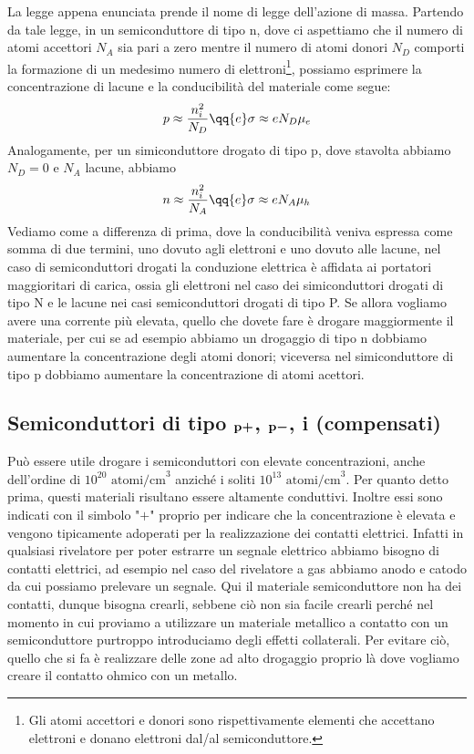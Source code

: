 La legge appena enunciata prende il nome di legge dell'azione di massa. Partendo da tale legge, in un semiconduttore di tipo n, dove ci aspettiamo che il numero di atomi accettori $N_A$ sia pari a zero mentre il numero di atomi donori $N_D$ comporti la formazione di un medesimo numero di elettroni\footnote{Gli atomi accettori e donori sono rispettivamente elementi che accettano elettroni e donano elettroni dal/al semiconduttore.}, possiamo esprimere la concentrazione di lacune e la conducibilità del materiale come segue:
\begin{equation*}
   p \approx \frac{n_i^2}{N_D}
   \qq{e}
   \sigma \approx e N_D \mu_e
\end{equation*}
Analogamente, per un simiconduttore drogato di tipo p, dove stavolta abbiamo $N_D=0$ e $N_A$ lacune, abbiamo 
\begin{equation*}
   n \approx \frac{n_i^2}{N_A}
   \qq{e}
   \sigma \approx e N_A \mu_h
\end{equation*}
Vediamo come a differenza di prima, dove la conducibilità veniva espressa come somma di due termini, uno dovuto agli elettroni e uno dovuto alle lacune, nel caso di semiconduttori drogati la conduzione elettrica è affidata ai portatori maggioritari di carica, ossia gli elettroni nel caso dei simiconduttori drogati di tipo N e le lacune nei casi semiconduttori drogati di tipo P. Se allora vogliamo avere una corrente più elevata, quello che dovete fare è drogare maggiormente il materiale, per cui se ad esempio abbiamo un drogaggio di tipo n dobbiamo aumentare la concentrazione degli atomi donori; viceversa nel simiconduttore di tipo p dobbiamo aumentare la concentrazione di atomi acettori.

\subsection[Semiconduttori di tipo \texorpdfstring{$\rm p+$}{p+}, \texorpdfstring{$\rm p-$}{p-}, i (compensati)]
{Semiconduttori di tipo $\boldsymbol{\rm p+}$, $\boldsymbol{\rm p-}$, i (compensati)}
Può essere utile drogare i semiconduttori con elevate concentrazioni, anche dell'ordine di $10^{20}\text{ atomi/cm}^3$ anziché i soliti $10^{13}\text{ atomi/cm}^3$. Per quanto detto prima, questi materiali risultano essere altamente conduttivi. Inoltre essi sono indicati con il simbolo "$+$" proprio per indicare che la concentrazione è elevata e vengono tipicamente adoperati per la realizzazione dei contatti elettrici. Infatti in qualsiasi rivelatore per poter estrarre un segnale elettrico abbiamo bisogno di contatti elettrici, ad esempio nel caso del rivelatore a gas abbiamo anodo e catodo da cui possiamo prelevare un segnale. Qui il materiale semiconduttore non ha dei contatti, dunque bisogna crearli, sebbene ciò non sia facile crearli perché nel momento in cui proviamo a utilizzare un materiale metallico a contatto con un semiconduttore purtroppo introduciamo degli effetti collaterali. Per evitare ciò, quello che si fa è realizzare delle zone ad alto drogaggio proprio là dove vogliamo creare il contatto ohmico con un metallo.

